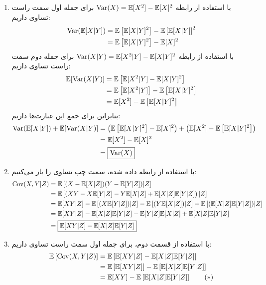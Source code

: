 \documentclass[a4paper, 11pt]{article}
\begin{document}
\begin{enumerate}[1.]
	\item
	با استفاده از رابطه
	$\mathrm{Var}(X) = {\mathbb E}[X^2] - {\mathbb E}[X]^2$
	برای جمله اول سمت راست تساوی داریم:
	\[
	\begin{aligned}
		\mathrm{Var}({\mathbb E}[X|Y])	&= {\mathbb E}\left[{\mathbb E}[X|Y]^2\right] - {\mathbb E}\left[{\mathbb E}[X|Y]\right]^2 \\
		&= {\mathbb E}\left[{\mathbb E}[X|Y]^2\right] - {\mathbb E}[X]^2
	\end{aligned}
	\]
	با استفاده از رابطه
	$\mathrm{Var}(X|Y) = {\mathbb E}[X^2|Y] - {\mathbb E}[X|Y]^2$
	برای جمله دوم سمت راست تساوی داریم:
	\[
	\begin{aligned}
		{\mathbb E}[\mathrm{Var}(X|Y)]	&= {\mathbb E}\left[ {\mathbb E}[X^2|Y] - {\mathbb E}[X|Y]^2 \right] \\
						&= {\mathbb E}\left[{\mathbb E}[X^2|Y]\right] - {\mathbb E}\left[{\mathbb E}[X|Y]^2\right] \\
						&= {\mathbb E}[X^2] - {\mathbb E}\left[{\mathbb E}[X|Y]^2\right]
	\end{aligned}
	\]
	بنابراین برای جمع این عبارت‌ها داریم:
	\[
	\begin{aligned}
		\mathrm{Var}({\mathbb E}[X|Y]) + {\mathbb E}[\mathrm{Var}(X|Y)] &= \left({\mathbb E}\left[{\mathbb E}[X|Y]^2\right] - {\mathbb E}[X]^2\right) + \left({\mathbb E}[X^2] - {\mathbb E}\left[{\mathbb E}[X|Y]^2\right]\right) \\
			&= {\mathbb E}[X^2] - {\mathbb E}[X]^2 \\
			&= \boxed{\mathrm{Var}(X)}
	\end{aligned}
	\]
	\item
	با استفاده از رابطه داده شده، سمت چپ تساوی را باز می‌کنیم:
	\[
	\begin{aligned}
		\mathrm{Cov}(X,Y|Z)	&= {\mathbb E}\left[(X - {\mathbb E}[X|Z])(Y - {\mathbb E}[Y|Z])|Z\right] \\
					&= {\mathbb E}\left[\left(XY - X{\mathbb E}[Y|Z] - Y{\mathbb E}[X|Z] +{\mathbb E}[X|Z]{\mathbb E}[Y|Z]\right) |Z\right] \\
					&= {\mathbb E}[XY|Z] - {\mathbb E}\left[(X{\mathbb E}[Y|Z])|Z\right] - {\mathbb E}\left[(Y{\mathbb E}[X|Z])|Z\right] + {\mathbb E}\left[({\mathbb E}[X|Z]{\mathbb E}[Y|Z])|Z\right] \\
					&= {\mathbb E}[XY|Z] - {\mathbb E}[X|Z]{\mathbb E}[Y|Z] - {\mathbb E}[Y|Z]{\mathbb E}[X|Z] + {\mathbb E}[X|Z]{\mathbb E}[Y|Z] \\
					&= \boxed{{\mathbb E}[XY|Z] - {\mathbb E}[X|Z]{\mathbb E}[Y|Z]}
	\end{aligned}
	\]
	\item
	با استفاده از قسمت دوم، برای جمله اول سمت راست تساوی  داریم:
	\[
	\begin{aligned}
		{\mathbb E}\left[\mathrm{Cov}(X,Y|Z)\right]	&= {\mathbb E}\left[{\mathbb E} [XY|Z] - {\mathbb E}[X|Z]{\mathbb E}[Y|Z]\right] \\
									&= {\mathbb E}\left[{\mathbb E} [XY|Z]\right] - {\mathbb E}\left[{\mathbb E}[X|Z]{\mathbb E}[Y|Z]\right] \\
									&= {\mathbb E}[XY] - {\mathbb E}\left[{\mathbb E}[X|Z]{\mathbb E}[Y|Z]\right] \qquad (\ast)
	\end{aligned}
\]
\end{enumerate}
\end{document}
